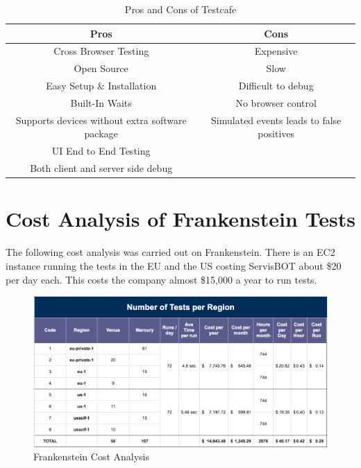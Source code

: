 \documentclass[12pt,a4paper,titlepage]{report}
\begin{document}
\begin{table}[H]
  \centering
  \small
  \setlength\tabcolsep{6pt}
  \begin{tabular}{|c|c|}
    \hline \textbf
    {Pros} & \textbf {Cons}\\
    \hline\hline
    Cross Browser Testing& Expensive\\
    \hline
    Open Source& Slow\\
    \hline
    Easy Setup \& Installation                      & Difficult to debug\\
    \hline
    Built-In Waits& No browser control\\
    \hline
    Supports devices without extra software package & Simulated events leads to false positives\\
    \hline
    UI End to End Testing \\
    \hline
    Both client and server side debug \\
    \hline
  \end{tabular}
  \caption{Pros and Cons of Testcafe}
\end{table}

\section{Cost Analysis of Frankenstein Tests}

The following cost analysis was carried out on Frankenstein. There is an EC2 instance running the tests in the EU and the US costing ServisBOT about \$20 per day each. This costs the company almost \$15,000 a year to run tests.

\begin{figure}[ht]
  \centering
  \includegraphics[width=\textwidth,height=\textheight,keepaspectratio]{./diagrams/frank_cost_analysis.png}
  \caption{Frankenstein Cost Analysis}
\end{figure}
\end{document}

